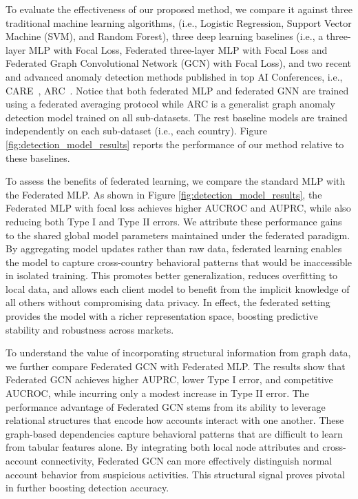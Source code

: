 \documentclass[11pt,english]{article}
\begin{document}
To evaluate the effectiveness of our proposed method, we compare it against three traditional machine learning algorithms, (i.e., Logistic Regression, Support Vector Machine (SVM), and Random Forest), three deep learning baselines (i.e., a three-layer MLP with Focal Loss, Federated three-layer MLP with Focal Loss and Federated Graph Convolutional Network (GCN) with Focal Loss), and two recent and advanced anomaly detection methods published in top AI Conferences, i.e., CARE~\parencite{zheng2025cluster}, ARC~\parencite{liu2024arc}. Notice that both federated MLP and federated GNN are trained using a federated averaging protocol while ARC is a generalist graph anomaly detection model trained on all sub-datasets. The rest baseline models are trained independently on each sub-dataset (i.e., each country). Figure \ref{fig:detection_model_results} reports the performance of our method relative to these baselines. 

To assess the benefits of federated learning, we compare the standard MLP with the Federated MLP. As shown in Figure \ref{fig:detection_model_results}, the Federated MLP with focal loss achieves higher AUCROC and AUPRC, while also reducing both Type I and Type II errors. We attribute these performance gains to the shared global model parameters maintained under the federated paradigm. By aggregating model updates rather than raw data, federated learning enables the model to capture cross-country behavioral patterns that would be inaccessible in isolated training. This promotes better generalization, reduces overfitting to local data, and allows each client model to benefit from the implicit knowledge of all others without compromising data privacy. In effect, the federated setting provides the model with a richer representation space, boosting predictive stability and robustness across markets.

To understand the value of incorporating structural information from graph data, we further compare Federated GCN with Federated MLP. The results show that Federated GCN achieves higher AUPRC, lower Type I error, and competitive AUCROC, while incurring only a modest increase in Type II error. The performance advantage of Federated GCN stems from its ability to leverage relational structures that encode how accounts interact with one another. These graph-based dependencies capture behavioral patterns that are difficult to learn from tabular features alone. By integrating both local node attributes and cross-account connectivity, Federated GCN can more effectively distinguish normal account behavior from suspicious activities. This structural signal proves pivotal in further boosting detection accuracy.
\end{document}
